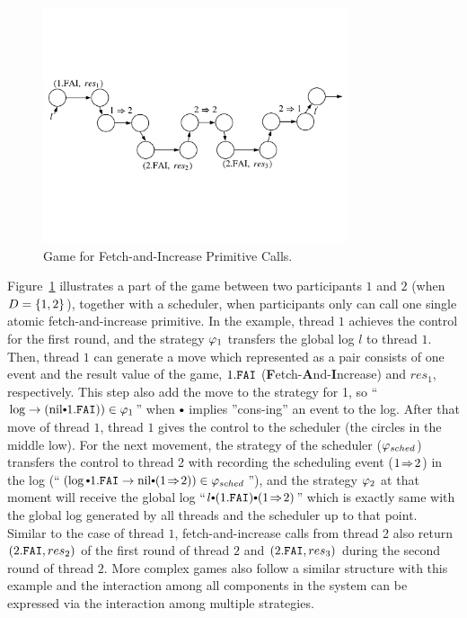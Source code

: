 \begin{figure}
\begin{center}
\includegraphics[width=0.8\textwidth]{figs/ccal/faiexample}
\end{center}%
\caption{Game for Fetch-and-Increase Primitive Calls.}
\label{fig:chapter:ccal:game-for-fetch-and-increase-primitive-call}
\end{figure}

Figure~\ref{fig:chapter:ccal:game-for-fetch-and-increase-primitive-call} illustrates 
a part of the game between two participants $1$ and $2$ (when $D = \{1, 2\}$), together with a scheduler,
when participants only can call one single atomic fetch-and-increase primitive.
In the example, thread $1$ achieves the control for the first round,
and the strategy  $\varphi_{1}$ transfers the global log $l$  to thread $1$. 
Then, thread $1$ can generate a move which represented as a pair consists of one event and the result value of the game,
$1.{\mathrm{\texttt{FAI}}}$ (\textbf{F}etch-\textbf{A}nd-\textbf{I}ncrease) and $res_1$, respectively.
This step also add the move to  the strategy for 1, so ``$\log \rightarrow (\nulllist \cons 1.\incticket)) \in \strat{1}$'' when 
$\cons$ implies ''cons-ing'' an event to the log.
After that move of thread $1$, thread $1$ gives the control to the scheduler (the circles in the middle low).
For the next movement, the strategy of the scheduler  ($\varphi_{sched}$)  transfers the control 
to thread 2 with recording the scheduling event ($1 \!\Rightarrow\! 2$) in the log (``$(\log \cons 1.\incticket \rightarrow \nulllist \cons (1 \switch 2)) \in \strat{sched}$''),
and the strategy  $\varphi_{2}$ at that moment will receive the global log ``$l \cons (1.\incticket) \cons (1 \switch 2)$''
which is exactly same with the global log generated by all threads and the scheduler up to that point.
Similar to the case of thread $1$, fetch-and-increase calls from thread 2 also return $(2.{\mathrm{\texttt{FAI}}}, res_2)$ of the first round of thread $2$
and $(2.{\mathrm{\texttt{FAI}}}, res_3)$ during the second round of thread $2$.
More complex games also follow a similar structure with this example and the interaction among all components in the system 
can be expressed via the interaction among multiple strategies.

